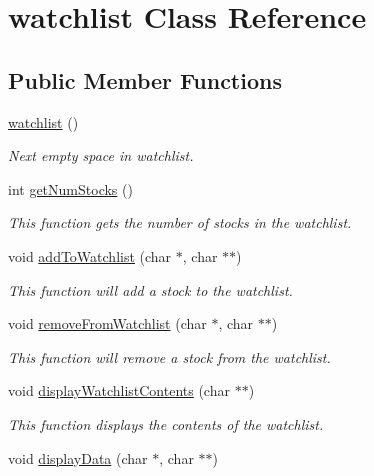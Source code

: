 \hypertarget{classwatchlist}{}\section{watchlist Class Reference}
\label{classwatchlist}
\subsection*{Public Member Functions}
\begin{DoxyCompactItemize}
\item 
\hyperlink{classwatchlist_a8c630ba7e17201eb4c7e2cef8e5d6c92}{watchlist} ()
\begin{DoxyCompactList}\small\item\em Next empty space in watchlist. \end{DoxyCompactList}\item 
int \hyperlink{classwatchlist_acdb445a23fda216d0a3284b3835f33ff}{get\+Num\+Stocks} ()
\begin{DoxyCompactList}\small\item\em This function gets the number of stocks in the watchlist. \end{DoxyCompactList}\item 
void \hyperlink{classwatchlist_a889735bbad56c0e0df354fd7a9498d36}{add\+To\+Watchlist} (char $\ast$, char $\ast$$\ast$)
\begin{DoxyCompactList}\small\item\em This function will add a stock to the watchlist. \end{DoxyCompactList}\item 
void \hyperlink{classwatchlist_a95423fb8cdc057441ae85b01eb8a4a9d}{remove\+From\+Watchlist} (char $\ast$, char $\ast$$\ast$)
\begin{DoxyCompactList}\small\item\em This function will remove a stock from the watchlist. \end{DoxyCompactList}\item 
void \hyperlink{classwatchlist_a4b3a8998a154b4a394f8e4538f37c497}{display\+Watchlist\+Contents} (char $\ast$$\ast$)
\begin{DoxyCompactList}\small\item\em This function displays the contents of the watchlist. \end{DoxyCompactList}\item 
void \hyperlink{classwatchlist_aaae1b9ec02340e8cf7722fe1da575dc5}{display\+Data} (char $\ast$, char $\ast$$\ast$)

\end{DoxyCompactItemize}
